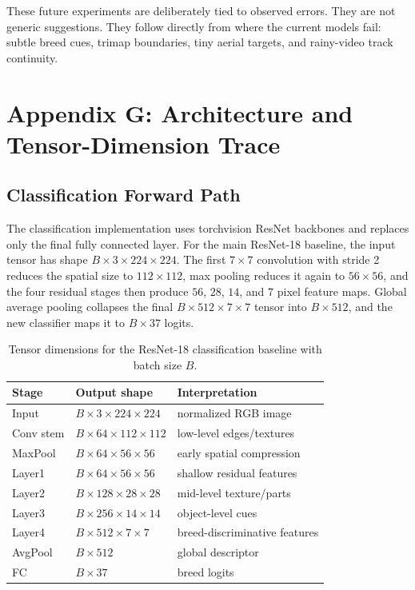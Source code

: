 \documentclass[10pt,twocolumn]{article}
\begin{document}
These future experiments are deliberately tied to observed errors. They are not generic suggestions. They follow directly from where the current models fail: subtle breed cues, trimap boundaries, tiny aerial targets, and rainy-video track continuity.

\section{Appendix G: Architecture and Tensor-Dimension Trace}

\subsection{Classification Forward Path}

The classification implementation uses torchvision ResNet backbones and replaces only the final fully connected layer. For the main ResNet-18 baseline, the input tensor has shape $B\times3\times224\times224$. The first $7\times7$ convolution with stride 2 reduces the spatial size to $112\times112$, max pooling reduces it again to $56\times56$, and the four residual stages then produce $56$, $28$, $14$, and $7$ pixel feature maps. Global average pooling collapses the final $B\times512\times7\times7$ tensor into $B\times512$, and the new classifier maps it to $B\times37$ logits.

\begin{table}[!htbp]
\centering
\caption{Tensor dimensions for the ResNet-18 classification baseline with batch size $B$.}
\label{tab:appendix_resnet_dims}
\begin{tabular}{lll}
\toprule
Stage & Output shape & Interpretation\\
\midrule
Input & $B\times3\times224\times224$ & normalized RGB image\\
Conv stem & $B\times64\times112\times112$ & low-level edges/textures\\
MaxPool & $B\times64\times56\times56$ & early spatial compression\\
Layer1 & $B\times64\times56\times56$ & shallow residual features\\
Layer2 & $B\times128\times28\times28$ & mid-level texture/parts\\
Layer3 & $B\times256\times14\times14$ & object-level cues\\
Layer4 & $B\times512\times7\times7$ & breed-discriminative features\\
AvgPool & $B\times512$ & global descriptor\\
FC & $B\times37$ & breed logits\\
\bottomrule
\end{tabular}
\end{table}
\end{document}
